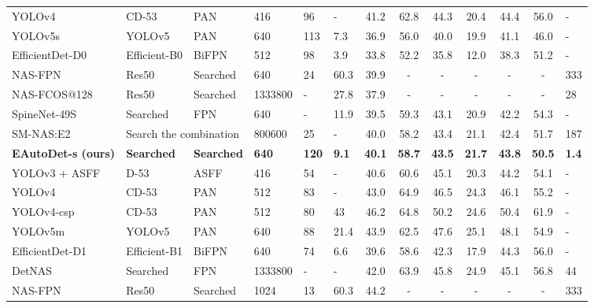 \documentclass[letterpaper]{article} \usepackage{aaai22}  \usepackage{times}  \usepackage{helvet}  \usepackage{courier}  \usepackage[hyphens]{url}  \usepackage{graphicx} \urlstyle{rm} \def\UrlFont{\rm}  \usepackage{natbib}  \usepackage{caption} \DeclareCaptionStyle{ruled}{labelfont=normalfont,labelsep=colon,strut=off} \frenchspacing  \setlength{\pdfpagewidth}{8.5in}  \setlength{\pdfpageheight}{11in}
\begin{document}
\begin{table*}[tb!]
{\begin{tabular}{llllll c c c c c c l}
\midrule
YOLOv4~\citeyearpar{bochkovskiy2020yolov4}     & CD-53  & PAN       & 416 & 96 & -   & 41.2 & 62.8 & 44.3 & 20.4 & 44.4 & 56.0 & - \\
YOLOv5s~\citeyearpar{yolov5}        &  YOLOv5 & PAN   & 640 & 113 & 7.3  & 36.9 & 56.0 &    40.0  &  19.9    & 41.1      &  46.0  & -   \\
EfficientDet-D0~\citeyearpar{tan2020efficientdet} & Efficient-B0 & BiFPN   & 512 & 98 & 3.9 & 33.8 & 52.2 & 35.8 & 12.0 & 38.3 & 51.2 & - \\
NAS-FPN~\citeyearpar{ghiasi2019fpn} & Res50& Searched  &640 &24 & 60.3 &39.9 & -& -& -& -& - & 333 \\  
NAS-FCOS@128~\citeyearpar{wang2020fcos}& Res50& Searched  & 1333800 & - & 27.8 &37.9 & -& -& -& -& - & 28 \\
SpineNet-49S~\citeyearpar{du2020spinenet}& Searched& FPN & 640 & - & 11.9 & 39.5 & 59.3 & 43.1 & 20.9 & 42.2 & 54.3 & - \\
SM-NAS:E2~\citeyearpar{yao2020sm}&\multicolumn{2}{H}{Search the combination} &800600& 25 & - & 40.0 & 58.2 & 43.4 & 21.1 & 42.4 & 51.7 & 187 \\
\textbf{EAutoDet-s (ours)}  &  \textbf{Searched}& \textbf{Searched}  &  \textbf{640}   &  \textbf{120} & \textbf{9.1}   &  \textbf{40.1}       &   \textbf{58.7}      &     \textbf{43.5 }   & \textbf{21.7}    &    \textbf{43.8}     &  \textbf{50.5}  & \textbf{1.4}    \\  
\midrule
YOLOv3 + ASFF~\citeyearpar{liu2019learning}  & D-53 &   ASFF   & 416 & 54 & -  & 40.6 & 60.6 & 45.1 & 20.3 & 44.2 & 54.1 & - \\
YOLOv4~\citeyearpar{bochkovskiy2020yolov4}     & CD-53  & PAN   & 512 & 83 & -  & 43.0 & 64.9 & 46.5 & 24.3 & 46.1 & 55.2 & - \\
YOLOv4-csp~\citeyearpar{wang2021scaled}    & CD-53& PAN  & 512 & 80 & 43  & 46.2 & 64.8 & 50.2 & 24.6 & 50.4 & 61.9 &- \\
YOLOv5m~\citeyearpar{yolov5}         &   YOLOv5 & PAN     & 640 & 88 & 21.4 & 43.9 & 62.5 &    47.6   &  25.1     & 48.1      &  54.9 & -    \\
EfficientDet-D1~\citeyearpar{tan2020efficientdet} & Efficient-B1 & BiFPN  & 640 & 74 & 6.6 & 39.6 & 58.6 & 42.3 & 17.9 & 44.3 & 56.0 & - \\
DetNAS~\citeyearpar{chen2019detnas}&Searched& FPN &1333800&- & - &42.0 &63.9 &45.8 &24.9 &45.1 &56.8 & 44 \\
NAS-FPN~\citeyearpar{ghiasi2019fpn} & Res50& Searched  &1024&13 & 60.3 &44.2 & -& -& -& -& - & 333 \\

\end{tabular}}
\end{table*}
\end{document}
